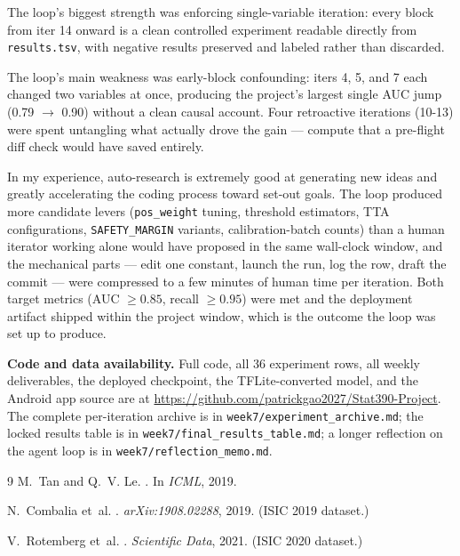 \documentclass{article}
\begin{document}
The loop's biggest strength was enforcing single-variable iteration:
every block from iter 14 onward is a clean controlled experiment
readable directly from \texttt{results.tsv}, with negative results
preserved and labeled rather than discarded.

The loop's main weakness was early-block confounding: iters 4, 5, and 7
each changed two variables at once, producing the project's largest
single AUC jump (0.79 $\to$ 0.90) without a clean causal account.
Four retroactive iterations (10-13) were spent untangling what actually
drove the gain --- compute that a pre-flight diff check would have saved
entirely.

In my experience, auto-research is extremely good at generating new
ideas and greatly accelerating the coding process toward set-out goals.
The loop produced more candidate levers (\texttt{pos\_weight} tuning,
threshold estimators, TTA configurations, \texttt{SAFETY\_MARGIN}
variants, calibration-batch counts) than a human iterator working alone
would have proposed in the same wall-clock window, and the mechanical
parts --- edit one constant, launch the run, log the row, draft the
commit --- were compressed to a few minutes of human time per
iteration. Both target metrics (AUC $\ge 0.85$, recall $\ge 0.95$) were
met and the deployment artifact shipped within the project window,
which is the outcome the loop was set up to produce.

\medskip
\noindent\textbf{Code and data availability.}
Full code, all 36 experiment rows, all weekly deliverables, the deployed
checkpoint, the TFLite-converted model, and the Android app source are at
\url{https://github.com/patrickgao2027/Stat390-Project}. The complete
per-iteration archive is in
\texttt{week7/experiment\_archive.md}; the locked results table is in
\texttt{week7/final\_results\_table.md}; a longer reflection on the
agent loop is in \texttt{week7/reflection\_memo.md}.


\begin{thebibliography}{9}
M.~Tan and Q.~V. Le.
.
\newblock In \emph{ICML}, 2019.

N.~Combalia et~al.
.
\newblock \emph{arXiv:1908.02288}, 2019. (ISIC 2019 dataset.)

V.~Rotemberg et~al.
.
\newblock \emph{Scientific Data}, 2021. (ISIC 2020 dataset.)
\end{thebibliography}
\end{document}
